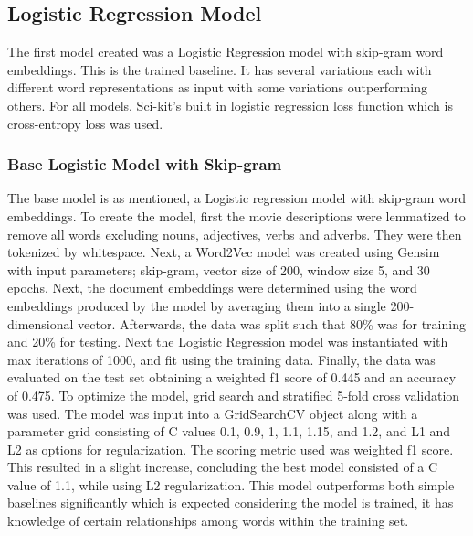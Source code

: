 \subsection{Logistic Regression Model}
The first model created was a Logistic Regression model with skip-gram word embeddings. 
This is the trained baseline. 
It has several variations each with different word representations as input with some variations outperforming others. 
For all models, Sci-kit’s built in logistic regression loss function which is cross-entropy loss was used.

\subsubsection{Base Logistic Model with Skip-gram}
The base model is as mentioned, a Logistic regression model with skip-gram word embeddings. 
To create the model, first the movie descriptions were lemmatized to remove all words excluding nouns, adjectives, verbs and adverbs. 
They were then tokenized by whitespace. 
Next, a Word2Vec model was created using Gensim with input parameters; skip-gram, vector size of 200, window size 5, and 30 epochs. 
Next, the document embeddings were determined using the word embeddings produced by the model by averaging them into a single 200-dimensional vector. 
Afterwards, the data was split such that 80\% was for training and 20\% for testing. 
Next the Logistic Regression model was instantiated with max iterations of 1000, and fit using the training data. 
Finally, the data was evaluated on the test set obtaining a weighted f1 score of 0.445 and an accuracy of 0.475. 
To optimize the model, grid search and stratified 5-fold cross validation was used. 
The model was input into a GridSearchCV object along with a parameter grid consisting of C values 0.1, 0.9, 1, 1.1, 1.15, and 1.2, and L1 and L2 as options for regularization. 
The scoring metric used was weighted f1 score. 
This resulted in a slight increase, concluding the best model consisted of a C value of 1.1, while using L2 regularization. 
This model outperforms both simple baselines significantly which is expected considering the model is trained, it has knowledge of certain relationships among words within the training set.

